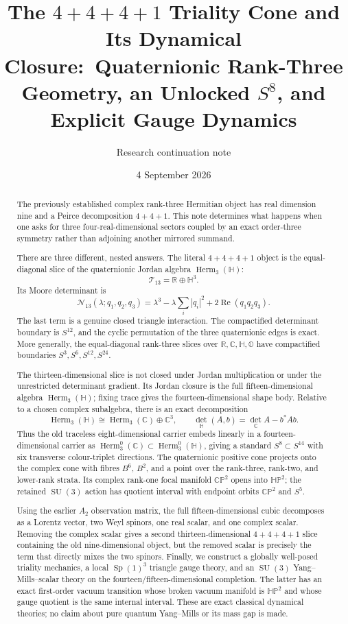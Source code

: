 \documentclass[11pt]{article}
\title{The \texorpdfstring{$4+4+4+1$}{4+4+4+1} Triality Cone and Its Dynamical Closure:\
Quaternionic Rank-Three Geometry, an Unlocked \texorpdfstring{$S^8$}{S8}, and Explicit Gauge Dynamics}
\author{Research continuation note}
\date{4 September 2026}
\theoremstyle{definition}
\theoremstyle{remark}
\newcommand{\R}{\mathbb R}
\newcommand{\C}{\mathbb C}
\newcommand{\Hh}{\mathbb H}
\newcommand{\CP}{\mathbb{CP}}
\newcommand{\HP}{\mathbb{HP}}
\newcommand{\Oo}{\mathbb O}
\newcommand{\Herm}{\operatorname{Herm}}
\newcommand{\Ree}{\operatorname{Re}}
\newcommand{\Sp}{\operatorname{Sp}}
\newcommand{\SU}{\operatorname{SU}}
\newcommand{\cT}{\mathcal T}
\newcommand{\cN}{\mathcal N}
\begin{document}
\maketitle

\begin{abstract}
The previously established complex rank-three Hermitian object has real dimension nine and a Peirce decomposition $4+4+1$.  This note determines what happens when one asks for three four-real-dimensional sectors coupled by an exact order-three symmetry rather than adjoining another mirrored summand.

There are three different, nested answers.  The literal $4+4+4+1$ object is the equal-diagonal slice of the quaternionic Jordan algebra $\Herm_3(\Hh)$:
\[
 \cT_{13}=\R\oplus\Hh^3.
\]
Its Moore determinant is
\[
 \cN_{13}(\lambda;q_1,q_2,q_3)
 =\lambda^3-\lambda\sum_i|q_i|^2+2\Ree(q_1q_2q_3).
\]
The last term is a genuine closed triangle interaction.  The compactified determinant boundary is $S^{12}$, and the cyclic permutation of the three quaternionic edges is exact.  More generally, the equal-diagonal rank-three slices over $\R,\C,\Hh,\Oo$ have compactified boundaries $S^3,S^6,S^{12},S^{24}$.

The thirteen-dimensional slice is not closed under Jordan multiplication or under the unrestricted determinant gradient.  Its Jordan closure is the full fifteen-dimensional algebra $\Herm_3(\Hh)$; fixing trace gives the fourteen-dimensional shape body.  Relative to a chosen complex subalgebra, there is an exact decomposition
\[
 \Herm_3(\Hh)\cong\Herm_3(\C)\oplus\C^3,
 \qquad
 \det_{\Hh}(A,b)=\det_{\C}A-b^*Ab.
\]
Thus the old traceless eight-dimensional carrier embeds linearly in a fourteen-dimensional carrier as
$\Herm_3^0(\C)\subset\Herm_3^0(\Hh)$, giving a standard $S^8\subset S^{14}$ with six transverse colour-triplet directions.  The quaternionic positive cone projects onto the complex cone with fibres $B^6$, $B^2$, and a point over the rank-three, rank-two, and lower-rank strata.  Its complex rank-one focal manifold $\CP^2$ opens into $\HP^2$; the retained $\SU(3)$ action has quotient interval with endpoint orbits $\CP^2$ and $S^5$.

Using the earlier $A_2$ observation matrix, the full fifteen-dimensional cubic decomposes as a Lorentz vector, two Weyl spinors, one real scalar, and one complex scalar.  Removing the complex scalar gives a second thirteen-dimensional $4+4+4+1$ slice containing the old nine-dimensional object, but the removed scalar is precisely the term that directly mixes the two spinors.  Finally, we construct a globally well-posed triality mechanics, a local $\Sp(1)^3$ triangle gauge theory, and an $\SU(3)$ Yang--Mills--scalar theory on the fourteen/fifteen-dimensional completion.  The latter has an exact first-order vacuum transition whose broken vacuum manifold is $\HP^2$ and whose gauge quotient is the same internal interval.  These are exact classical dynamical theories; no claim about pure quantum Yang--Mills or its mass gap is made.
\end{abstract}
\end{document}

